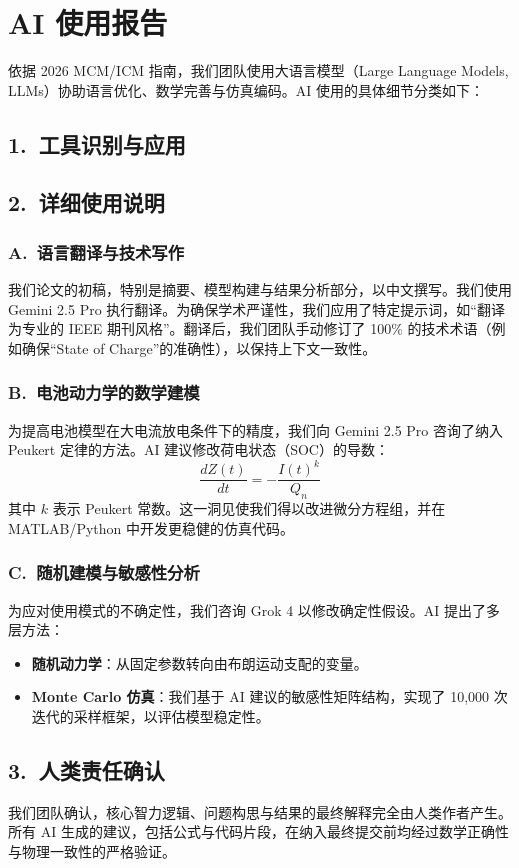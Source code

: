 \documentclass[11pt,a4paper]{ctexart}
\begin{document}
\newpage

\section*{AI 使用报告}

依据 2026 MCM/ICM 指南，我们团队使用大语言模型（Large Language Models, LLMs）协助语言优化、数学完善与仿真编码。AI 使用的具体细节分类如下：

\subsection*{1.\ 工具识别与应用}

\subsection*{2.\ 详细使用说明}

\subsubsection*{A.\ 语言翻译与技术写作}

我们论文的初稿，特别是摘要、模型构建与结果分析部分，以中文撰写。我们使用 Gemini 2.5 Pro 执行翻译。为确保学术严谨性，我们应用了特定提示词，如“翻译为专业的 IEEE 期刊风格”。翻译后，我们团队手动修订了 100\% 的技术术语（例如确保“State of Charge”的准确性），以保持上下文一致性。

\subsubsection*{B.\ 电池动力学的数学建模}

为提高电池模型在大电流放电条件下的精度，我们向 Gemini 2.5 Pro 咨询了纳入 Peukert 定律的方法。AI 建议修改荷电状态（SOC）的导数：
\begin{equation}
\frac{dZ(t)}{dt}=-\frac{I(t)^{k}}{Q_n}
\end{equation}
其中 $k$ 表示 Peukert 常数。这一洞见使我们得以改进微分方程组，并在 MATLAB/Python 中开发更稳健的仿真代码。

\subsubsection*{C.\ 随机建模与敏感性分析}

为应对使用模式的不确定性，我们咨询 Grok 4 以修改确定性假设。AI 提出了多层方法：

\begin{itemize}
\item \textbf{随机动力学}：从固定参数转向由布朗运动支配的变量。
\item \textbf{Monte Carlo 仿真}：我们基于 AI 建议的敏感性矩阵结构，实现了 10,000 次迭代的采样框架，以评估模型稳定性。
\end{itemize}

\subsection*{3.\ 人类责任确认}

我们团队确认，核心智力逻辑、问题构思与结果的最终解释完全由人类作者产生。所有 AI 生成的建议，包括公式与代码片段，在纳入最终提交前均经过数学正确性与物理一致性的严格验证。
\end{document}
